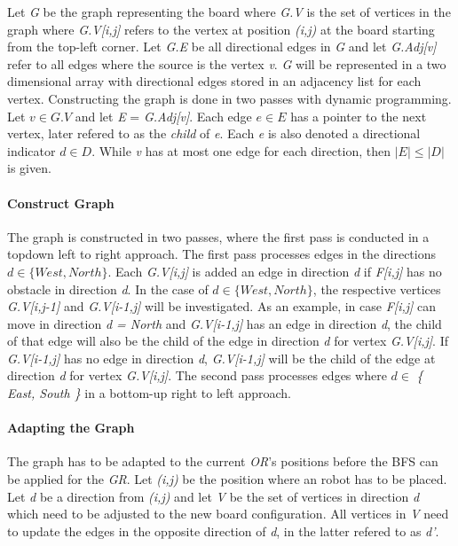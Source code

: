 \documentclass[]{article}
\let\oldparagraph\paragraph
\renewcommand{\paragraph}[1]{\oldparagraph{#1}\mbox{}}
\begin{document}
Let \emph{G} be the graph representing the board where \emph{G.V} is the
set of vertices in the graph where \emph{G.V{[}i,j{]}} refers to the
vertex at position \emph{(i,j)} at the board starting from the top-left
corner. Let \emph{G.E} be all directional edges in \emph{G} and let
\emph{G.Adj{[}v{]}} refer to all edges where the source is the vertex
\emph{v}. \emph{G} will be represented in a two dimensional array with
directional edges stored in an adjacency list for each vertex.
Constructing the graph is done in two passes with dynamic programming.
Let \(v \in G.V\) and let \emph{E} = \emph{G.Adj{[}v{]}}. Each edge
\(e \in E\) has a pointer to the next vertex, later refered to as the
\emph{child} of \emph{e}. Each \emph{e} is also denoted a directional
indicator \(d \in D\). While \emph{v} has at most one edge for each
direction, then \(|E| \leq |D|\) is given.

\paragraph{Construct Graph}\label{construct-graph}

The graph is constructed in two passes, where the first pass is
conducted in a topdown left to right approach. The first pass processes
edges in the directions \(d \in \{West, North\}\). Each
\emph{G.V{[}i,j{]}} is added an edge in direction \emph{d} if
\emph{F{[}i,j{]}} has no obstacle in direction \emph{d}. In the case of
\(d \in \{West, North \}\), the respective vertices
\emph{G.V{[}i,j-1{]}} and \emph{G.V{[}i-1,j{]}} will be investigated. As
an example, in case \emph{F{[}i,j{]}} can move in direction \emph{d =
North} and \emph{G.V{[}i-1,j{]}} has an edge in direction \emph{d}, the
child of that edge will also be the child of the edge in direction
\emph{d} for vertex \emph{G.V{[}i,j{]}}. If \emph{G.V{[}i-1,j{]}} has no
edge in direction \emph{d}, \emph{G.V{[}i-1,j{]}} will be the child of
the edge at direction \emph{d} for vertex \emph{G.V{[}i,j{]}}. The
second pass processes edges where \(d \in\) \emph{\{ East, South \}} in
a bottom-up right to left approach.

\paragraph{Adapting the Graph}\label{adapting-the-graph}

The graph has to be adapted to the current \emph{OR}'s positions before
the BFS can be applied for the \emph{GR}. Let \emph{(i,j)} be the
position where an robot has to be placed. Let \emph{d} be a direction
from \emph{(i,j)} and let \emph{V} be the set of vertices in direction
\emph{d} which need to be adjusted to the new board configuration. All
vertices in \emph{V} need to update the edges in the opposite direction
of \emph{d}, in the latter refered to as \emph{d'}.
\end{document}
